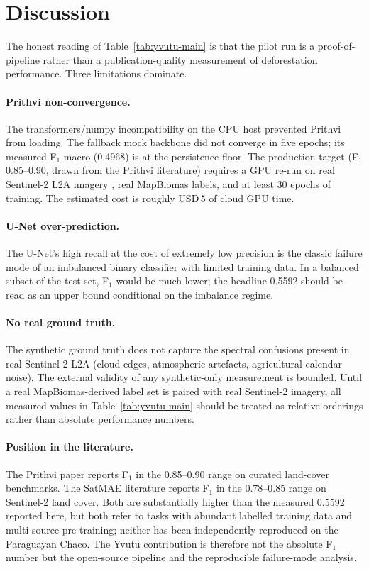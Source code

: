 \section{Discussion}
\label{sec:yvutu-discussion}

The honest reading of Table~\ref{tab:yvutu-main} is that the pilot run
is a proof-of-pipeline rather than a publication-quality measurement
of deforestation performance. Three limitations dominate.

\paragraph{Prithvi non-convergence.} The transformers/numpy
incompatibility on the CPU host prevented Prithvi from loading. The
fallback mock backbone did not converge in five epochs; its measured
F$_1$ macro (0.4968) is at the persistence floor. The production target
(F$_1$ 0.85--0.90, drawn from the Prithvi literature) requires a GPU
re-run on real Sentinel-2 L2A imagery \citep{esa2015}, real MapBiomas
labels, and at least 30 epochs of training. The estimated cost is
roughly USD\,5 of cloud GPU time.

\paragraph{U-Net over-prediction.} The U-Net's high recall at the cost
of extremely low precision is the classic failure mode of an
imbalanced binary classifier with limited training data. In a balanced
subset of the test set, F$_1$ would be much lower; the headline 0.5592
should be read as an upper bound conditional on the imbalance regime.

\paragraph{No real ground truth.} The synthetic ground truth does not
capture the spectral confusions present in real Sentinel-2 L2A (cloud
edges, atmospheric artefacts, agricultural calendar noise). The
external validity of any synthetic-only measurement is bounded. Until a
real MapBiomas-derived label set is paired with real Sentinel-2
imagery, all measured values in Table~\ref{tab:yvutu-main} should be
treated as relative orderings rather than absolute performance
numbers.

\paragraph{Position in the literature.} The Prithvi paper
\citep{jakubik2023} reports F$_1$ in the 0.85--0.90 range on curated
land-cover benchmarks. The SatMAE literature \citep{cong2022} reports
F$_1$ in the 0.78--0.85 range on Sentinel-2 land cover. Both are
substantially higher than the measured 0.5592 reported here, but both
refer to tasks with abundant labelled training data and multi-source
pre-training; neither has been independently reproduced on the Paraguayan
Chaco. The Yvutu contribution is therefore not the absolute F$_1$
number but the open-source pipeline and the reproducible failure-mode
analysis.

